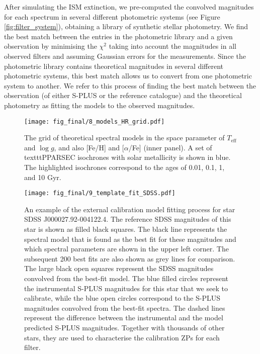 \documentclass[fleqn,usenatbib]{mnras}
\begin{document}
After simulating the ISM extinction, we pre-computed the convolved magnitudes for each spectrum in several different photometric systems (see Figure \ref{fig:filter_system}), obtaining a library of synthetic stellar photometry. We find the best match between the entries in the photometric library and a given observation by minimising the $\chi^2$ taking into account the magnitudes in all observed filters and assuming Gaussian errors for the measurements. Since the photometric library contains theoretical magnitudes in several different photometric systems, this best match allows us to convert from one photometric system to another. We refer to this process of finding the best match between the observation (of either S-PLUS or the reference catalogue) and the theoretical photometry as fitting the models to the observed magnitudes.

\begin{figure}
\begin{center}
\texttt{[image: fig\_final/8\_models\_HR\_grid.pdf]}
\caption{\label{fig:modelsHR}The grid of \citep{Coelho14} theoretical spectral models in the space parameter of $T_\mathrm{eff}$ and $\log g$, and also [Fe/H] and [$\alpha$/Fe] (inner panel). A set of texttt{PPARSEC} isochrones \citep{Bressan+2012, Marigo+2017} with solar metallicity is shown in blue. The highlighted isochrones correspond to the ages of 0.01, 0.1, 1, and 10 Gyr.}
\end{center}
\end{figure}

\begin{figure*}
\begin{center}
\texttt{[image: fig\_final/9\_template\_fit\_SDSS.pdf]}
\caption{An example of the external calibration model fitting process for star SDSS J000027.92-004122.4. The reference SDSS magnitudes \citep{Ivezic+2007} of this star is shown as filled black squares. The black line represents the spectral model that is found as the best fit for these magnitudes and which spectral parameters are shown in the upper left corner. The subsequent 200 best fits are also shown as grey lines for comparison. The large black open squares represent the SDSS magnitudes convolved from the best-fit model. The blue filled circles represent the instrumental S-PLUS magnitudes for this star that we seek to calibrate, while the blue open circles correspond to the S-PLUS magnitudes convolved from the best-fit spectra. The dashed lines represent the difference between the instrumental and the model predicted S-PLUS magnitudes. Together with thousands of other stars, they are used to characterise the calibration ZPs for each filter. }
\label{fig::model_fit_sdss_example}
\end{center}
\end{figure*}
\end{document}
